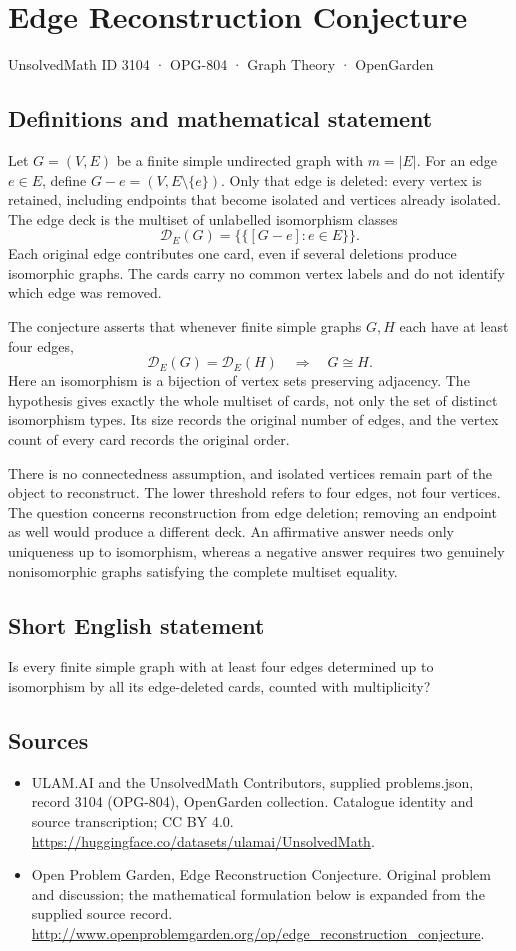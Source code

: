 \documentclass[11pt,a4paper]{article}
\begin{document}
\section*{Edge Reconstruction Conjecture}\label{3104}
{\small UnsolvedMath ID 3104 · OPG-804 · Graph Theory · OpenGarden}
\subsection{Definitions and mathematical statement}
Let $G=(V,E)$ be a finite simple undirected graph with $m=|E|$.
For an edge $e\in E$, define $G-e=(V,E\setminus\{e\})$.
Only that edge is deleted: every vertex is retained, including endpoints
that become isolated and vertices already isolated. The edge deck is the
multiset of unlabelled isomorphism classes
\[
 \mathcal D_E(G)=\{\!\{[G-e]:e\in E\}\!\}.
\]
Each original edge contributes one card, even if several deletions produce
isomorphic graphs. The cards carry no common vertex labels and do not
identify which edge was removed.

The conjecture asserts that whenever finite simple graphs $G,H$ each
have at least four edges,
\[
 \mathcal D_E(G)=\mathcal D_E(H)\quad\Longrightarrow\quad G\cong H.
\]
Here an isomorphism is a bijection of vertex sets preserving adjacency.
The hypothesis gives exactly the whole multiset of cards, not only the
set of distinct isomorphism types. Its size records the original number
of edges, and the vertex count of every card records the original order.

There is no connectedness assumption, and isolated vertices remain part
of the object to reconstruct. The lower threshold refers to four edges,
not four vertices. The question concerns reconstruction from edge deletion;
removing an endpoint as well would produce a different deck.
An affirmative answer needs only uniqueness up to isomorphism, whereas
a negative answer requires two genuinely nonisomorphic graphs satisfying
the complete multiset equality.
\subsection{Short English statement}
Is every finite simple graph with at least four edges determined up to isomorphism by all its edge-deleted cards, counted with multiplicity?
\subsection{Sources}
\begin{itemize}
\item[S1] ULAM.AI and the UnsolvedMath Contributors, supplied problems.json, record 3104 (OPG-804), OpenGarden collection. Catalogue identity and source transcription; CC BY 4.0.
\url{https://huggingface.co/datasets/ulamai/UnsolvedMath}.
\item[S2] Open Problem Garden, Edge Reconstruction Conjecture. Original problem and discussion; the mathematical formulation below is expanded from the supplied source record.
\url{http://www.openproblemgarden.org/op/edge_reconstruction_conjecture}.
\end{itemize}
\end{document}
